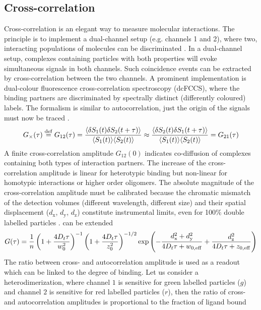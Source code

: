 \subsection{Cross-correlation}
\label{sec:theor.cross}
Cross-correlation is an elegant way to measure molecular interactions. The principle is to implement a dual-channel setup (e.g. channels 1 and 2), where two, interacting populations of molecules can be discriminated \cite{Foo2012,Ries2010,Schwille1997,Weidemann2002}. In a dual-channel setup, complexes containing particles with both properties will evoke simultaneous signals in both channels. Such coincidence events can be extracted by cross-correlation between the two channels. A prominent implementation is dual-colour fluorescence cross-correlation spectroscopy (dcFCCS), where the binding partners are discriminated by spectrally distinct (differently coloured) labels. The formalism is similar to autocorrelation, just the origin of the signals must now be traced \cite{Rippe2000,Weidemann2002,Schwille1997}.
	\begin{equation}
	\label{eq19}
	G_\times (\tau) \stackrel{\rm def}{=} G_{12} (\tau) = \frac{\langle \delta S_1(t) \delta S_2(t+\tau)\rangle}{\langle S_1(t) \rangle \langle S_2(t) \rangle} \approx \frac{\langle \delta S_2(t) \delta S_1(t+\tau)\rangle}{\langle S_1(t) \rangle \langle S_2(t) \rangle} =  G_{21} (\tau)
	\end{equation}
A finite cross-correlation amplitude $G_{12}(0)$ indicates co-diffusion of complexes containing both types of interaction partners. The increase of the cross-correlation amplitude is linear for heterotypic binding but non-linear for homotypic interactions or higher order oligomers. The absolute magnitude of the cross-correlation amplitude must be calibrated because the chromatic mismatch of the detection volumes (different wavelength, different size) and their spatial displacement ($d_\mathrm{x}$, $d_\mathrm{y}$, $d_\mathrm{z}$) constitute instrumental limits, even for 100\% double labelled particles \cite{Weidemann2002}.  can be extended
	\begin{equation}
	\label{eq20}
	G(\tau) = \frac{1}{n} \left(1+\frac{4 D_t \tau}{w_0^2} \right) ^{-1} \left(1+\frac{4D_t \tau}{z_0^2} \right)^{-1/2} \exp \left(- \frac{d_\mathrm{x}^2 + d_\mathrm{y}^2}{4 D_t \tau + w_{0,\rm eff}} + \frac{d_\mathrm{z}^2}{4 D_t \tau + z_{0,\rm eff}} \right)
	\end{equation}
The ratio between cross- and autocorrelation amplitude is used as a readout which can be linked to the degree of binding. Let us consider a heterodimerization, where channel $1$ is sensitive for green labelled particles ($g$) and channel $2$ is sensitive for red labelled particles ($r$), then the ratio of cross- and autocorrelation amplitudes is proportional to the fraction of ligand bound \cite{Weidemann2002}
